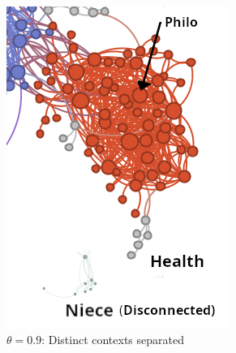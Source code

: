 \documentclass{svproc}
\begin{document}
\begin{figure}[h]
\centering
\begin{subfigure}{0.48\textwidth}
    \centering
    \includegraphics[width=\textwidth]{./images/refine/crop-left.png}
    \caption{$\theta=0.9$: Distinct contexts separated}
\end{subfigure}
\hfill
\begin{subfigure}{0.48\textwidth}
    \centering

\end{subfigure}
\end{figure}
\end{document}
